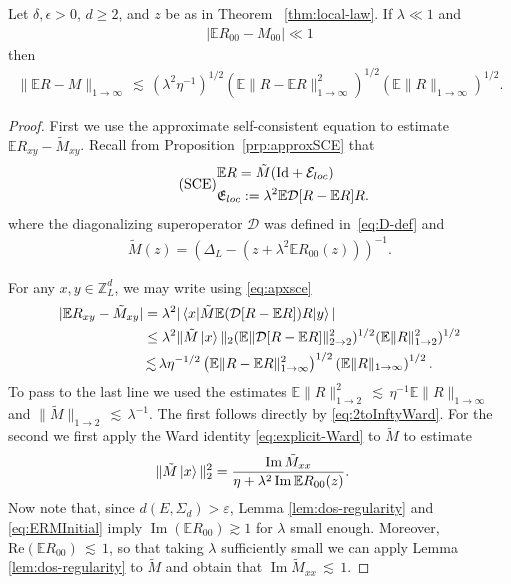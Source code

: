 \documentclass[10pt,a4paper]{amsart}
\def\Expec{{\mathbb E}}
\def\Z{{\mathbb{Z}}}
\def\braket#1{\mathinner{\langle{#1}\rangle}}
\def\eps{{\varepsilon}}
\def\ket#1{\mathinner{|{#1}\rangle}}
\def\lsim{{\,\lesssim\,}}
\newcommand{\Id}{{\operatorname*{Id}}}
\newcommand{\Impt}{\operatorname*{Im}}
\newcommand{\mcal}[1]{{\mathcal{#1}}}
\begin{document}
\begin{lemma}
\label{lem:fluct-to-er}
Let $\delta,\epsilon>0$, $d\geq 2$, and $z$ be as in Theorem ~\ref{thm:local-law}.
If $ \lambda\ll 1$ and
\begin{align}\label{eq:ERMInitial}
   |\Expec R_{00}-M_{00}|\ll 1
\end{align}
then
\begin{align*}
\|\Expec R - M\|_{1\to \infty}
\lsim(\lambda^2\eta^{-1})^{1 /2} \left(  \Expec \|R-\Expec R\|_{1\to \infty}^{2}\right) ^{1/ 2}
\left( \Expec\|R\|_{1\to \infty} \right)^{1 /2}.
\end{align*}


\end{lemma}

\begin{proof}
First we use the approximate self-consistent equation to estimate $\mathbb{E}R_{xy}-\tilde{M}_{xy}$. Recall from Proposition~\ref{prp:approxSCE} that
\begin{equation}\tag*{(SCE)}
\label{eq:apxsce}
\begin{split}
&\mathbb{E}R = \tilde{M}(\Id+\mcal{E}_{\rm loc}) \\
&\mathfrak{E}_{\rm loc} := \lambda^2\mathbb{E}\mathcal{D}[R-\Expec R]R.
\end{split}
\end{equation}
where the diagonalizing superoperator $\mcal{D}$ was defined in~\eqref{eq:D-def} and
\begin{align*}
\tilde{M}(z)=(\Delta_L-(z+\lambda^{2}\Expec R_{00}(z)))^{-1}.
\end{align*}

For any $x,y\in \Z^{d}_{L}$, we may write using \ref{eq:apxsce}
\begin{align*}
|\Expec R_{xy} - \tilde{M}_{xy}|
&= \lambda^2 |\braket{x|\tilde{M} \Expec (\mcal{D}[R-\Expec R])R|y}| \\
&\leq \lambda^2\|\tilde{M}\ket{x}\|_{2}(\Expec \|\mcal{D}[R-\Expec R]\|_{2\to 2}^2)^{1/2}
(\Expec \|R\|_{1\to 2}^2)^{1/2} \\
&\lsim \lambda\eta^{-1 / 2} \left(  \Expec \|R-\Expec R\|_{1\to \infty}^{2}\right) ^{1/ 2}
\left( \Expec\|R\|_{1\to \infty} \right)^{1 /2}.
\end{align*}
To pass to the last line we used the estimates $\mathbb{E}\|R\|_{1\to 2}^2\lsim \eta^{-1}\mathbb{E}\|R\|_{1\to\infty}$
and $\|\tilde{M}\|_{1\to 2}\lsim \lambda^{-1}$. The first follows directly by
\eqref{eq:2toInftyWard}. For the second we first apply the Ward identity \eqref{eq:explicit-Ward}
to $\tilde{M}$ to estimate
\begin{align*}
\|\tilde{M}\ket{x}\|_{2}^2
& = \frac{\Impt \tilde{M}_{xx}}{\eta + \lambda^2\Impt\mathbb{E}R_{00}(z)}.
\end{align*}
Now note that, since $d(E,\Sigma_d)>\eps$,  Lemma \ref{lem:dos-regularity} and \eqref{eq:ERMInitial} imply $\Impt(\mathbb{E}R_{00})\gtrsim 1$ for $\lambda$
small enough.  Moreover, $\text{Re}(\mathbb{E}R_{00})\lsim 1$, so that
taking $\lambda$ sufficiently small we can apply Lemma \ref{lem:dos-regularity} to $\tilde{M}$ and obtain that $\Impt{\tilde{M}_{xx}}\lsim 1$.



\end{proof}
\end{document}
